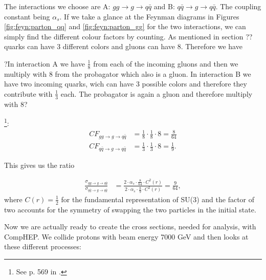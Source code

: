 The interactions we choose are A: $gg \rightarrow g \rightarrow q \bar q$ and B: $q \bar q \rightarrow g \rightarrow q \bar q$. The coupling constant being $\alpha_{s}$. If we take a glance at the Feynman diagrams in Figures \ref{fig:feyn:parton_qq} and \ref{fig:feyn:parton_gg} for the two interactions, we can simply find the different colour factors by counting. As mentioned in section ?? quarks can have 3 different colors and gluons can have 8. Therefore we have

?In interaction A we have $\frac{1}{8}$ from each of the incoming gluons and then we multiply with 8 from the probagator which also is a gluon. In interaction B we have two incoming quarks, wich can have 3 possible colors and therefore they contribute with $\frac{1}{3}$ each. The probagator is again a gluon and therefore multiply with 8?

\footnote{See p. 569 in  \cite{peskin1993iqf}.}:
\begin{align}
	CF_{gg \rightarrow g \rightarrow q \bar q}&=\frac{1}{8} \cdot \frac{1}{8} \cdot 8=\frac{8}{64}\\
	CF_{q \bar q \rightarrow g \rightarrow q \bar q}&=\frac{1}{3} \cdot \frac{1}{3} \cdot 8=\frac{1}{9}.
\end{align}

This gives us the ratio

\begin{align}
	\frac{\sigma_{gg \rightarrow g \rightarrow q \bar q}}{\sigma_{q \bar q \rightarrow g \rightarrow q \bar q}} &=\frac{2 \cdot \alpha_{s} \cdot \frac{8}{64} \cdot C^{2}(r)}{2 \cdot \alpha_{s} \cdot \frac{8}{9} \cdot C^{2}(r)}=\frac{9}{64},
\end{align}
where $C(r) = \frac{1}{2}$ for the fundamental representation of SU(3) and the factor of two accounts for the symmetry of swapping the two particles in the initial state.


Now we are actually ready to create the cross sections, needed for analysis, with CompHEP. We collide protons with beam energy 7000 GeV and then looks at these different processes:


